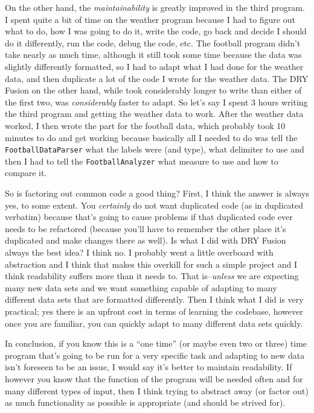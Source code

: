 \documentclass[11pt]{article} %
\begin{document}
\begin{itemize}
On the other hand, the \textit{maintainability} is greatly improved in the third
program. I spent quite a bit of time on the weather program because I had to 
figure out what to do, how I was going to do it, write the code, go back and 
decide I should do it differently, run the code, debug the code, etc. The 
football program didn't take nearly as much time, although it still took some 
time because the data was slightly differently formatted, so I had to adapt what
I had done for the weather data, and then duplicate a lot of the code I wrote 
for the weather data. The DRY Fusion on the other hand, while took considerably 
longer to write than either of the first two, was \textit{considerably} faster 
to adapt. So let's say I spent 3 hours writing the third program and getting the
weather data to work. After the weather data worked, I then wrote the part for 
the football data, which probably took 10 minutes to do and get working because 
basically all I needed to do was tell the \texttt{FootballDataParser} what the 
labels were (and type), what delimiter to use and then I had to tell the 
\texttt{FootballAnalyzer} what measure to use and how to compare it. 

So is factoring out common code a good thing? First, I think the answer is 
always yes, to some extent. You \textit{certainly} do not want duplicated code 
(as in duplicated verbatim) because that's going to cause problems if that 
duplicated code ever needs to be refactored (because you'll have to remember the
other place it's duplicated and make changes there as well). Is what I did with 
DRY Fusion always the best idea? I think no. I probably went a little overboard 
with abstraction and I think that makes this overkill for such a simple project 
and I think readability suffers more than it needs to. That is--\textit{unless} 
we are expecting many new data sets and we want something capable of adapting to
many different data sets that are formatted differently. Then I think what I did
is very practical; yes there is an upfront cost in terms of learning the 
codebase, however once you are familiar, you can quickly adapt to many different
data sets quickly.

In conclusion, if you know this is a ``one time'' (or maybe even two or three) 
time program that's going to be run for a very specific task and adapting to new
data isn't foreseen to be an issue, I would say it's better to maintain 
readability. If however you know that the function of the program will be needed
often and for many different types of input, then I think trying to abstract 
away (or factor out) as much functionality as possible is appropriate (and 
should be strived for).
\end{itemize}
\end{document}
